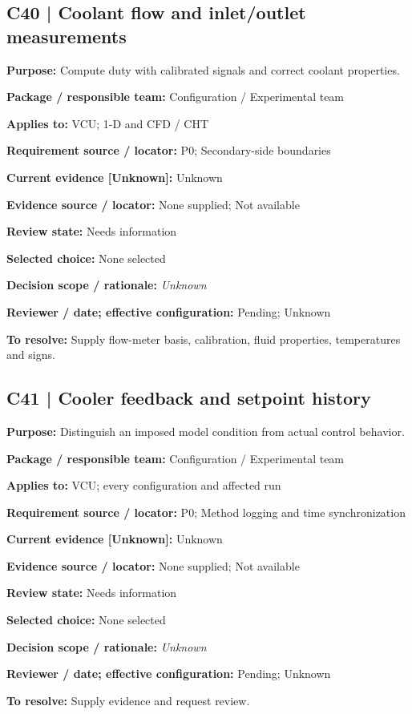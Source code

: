 \documentclass[11pt]{article}
\begin{document}
\par\noindent\begin{minipage}{\textwidth}\small\setlength{\parskip}{2pt}
\subsection*{C40 | Coolant flow and inlet/outlet measurements}
\textbf{Purpose:} Compute duty with calibrated signals and correct coolant properties.\par
\textbf{Package / responsible team:} Configuration / Experimental team\par
\textbf{Applies to:} VCU; 1-D and CFD / CHT\par
\textbf{Requirement source / locator:} P0; Secondary-side boundaries\par
\textbf{Current evidence [Unknown]:} Unknown\par
\textbf{Evidence source / locator:} None supplied; Not available\par
\textbf{Review state:} Needs information\par
\textbf{Selected choice:} None selected\par
\textbf{Decision scope / rationale:} \textit{Unknown}\par
\textbf{Reviewer / date; effective configuration:} Pending; Unknown\par
\textbf{To resolve:} Supply flow-meter basis, calibration, fluid properties, temperatures and signs.\par
\end{minipage}\par\vspace{5pt}
\par\noindent\begin{minipage}{\textwidth}\small\setlength{\parskip}{2pt}
\subsection*{C41 | Cooler feedback and setpoint history}
\textbf{Purpose:} Distinguish an imposed model condition from actual control behavior.\par
\textbf{Package / responsible team:} Configuration / Experimental team\par
\textbf{Applies to:} VCU; every configuration and affected run\par
\textbf{Requirement source / locator:} P0; Method logging and time synchronization\par
\textbf{Current evidence [Unknown]:} Unknown\par
\textbf{Evidence source / locator:} None supplied; Not available\par
\textbf{Review state:} Needs information\par
\textbf{Selected choice:} None selected\par
\textbf{Decision scope / rationale:} \textit{Unknown}\par
\textbf{Reviewer / date; effective configuration:} Pending; Unknown\par
\textbf{To resolve:} Supply evidence and request review.\par
\end{minipage}\par\vspace{5pt}
\end{document}
